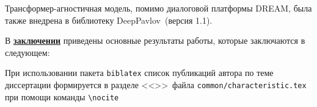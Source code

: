 Трансформер-агностичная модель, помимо диалоговой платформы DREAM, была также внедрена в библиотеку DeepPavlov~\cite{dp_2023}(версия 1.1).


В \underline{\textbf{заключении}} приведены основные результаты работы, которые заключаются в следующем:


При использовании пакета \verb!biblatex! список публикаций автора по теме
диссертации формируется в разделе <<\publications>>\ файла
\verb!common/characteristic.tex!  при помощи команды \verb!\nocite!


